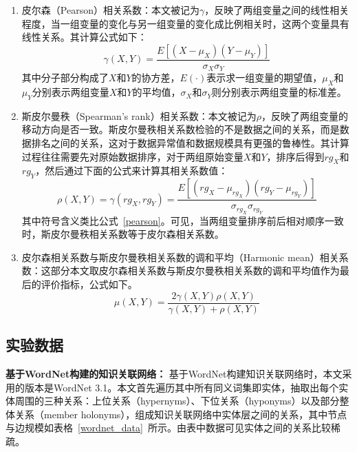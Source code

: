 \begin{enumerate}
    \item 皮尔森（Pearson）相关系数：本文被记为$\gamma$，反映了两组变量之间的线性相关程度，当一组变量的变化与另一组变量的变化成比例相关时，这两个变量具有线性关系。其计算公式如下：
    \begin{equation}
        \label{pearson}
        \gamma(X, Y) = \frac{E[(X-\mu_X)(Y-\mu_Y)]}{\sigma_X \sigma_Y}
    \end{equation}
    \noindent 其中分子部分构成了$X$和$Y$的协方差，$E(\cdot)$表示求一组变量的期望值，$\mu_X$和$\mu_Y$分别表示两组变量$X$和$Y$的平均值，$\sigma_X$和$\sigma_Y$则分别表示两组变量的标准差。
    \item 斯皮尔曼秩（Spearman's rank）相关系数：本文被记为$\rho$，反映了两组变量的移动方向是否一致。斯皮尔曼秩相关系数检验的不是数据之间的关系，而是数据排名之间的关系，这对于数据异常值和数据规模具有更强的鲁棒性。其计算过程往往需要先对原始数据排序，对于两组原始变量$X$和$Y$，排序后得到$rg_X$和$rg_Y$，然后通过下面的公式来计算其相关系数值：
    \begin{equation}
        \label{spearman}
        \rho(X, Y) = \gamma(rg_X, rg_Y) =  \frac{E[(rg_X-\mu_{rg_X})(rg_Y-\mu_{rg_Y})]}{\sigma_{rg_X} \sigma_{rg_Y}}
    \end{equation}
    \noindent 其中符号含义类比公式~\ref{pearson}。可见，当两组变量排序前后相对顺序一致时，斯皮尔曼秩相关系数等于皮尔森相关系数。
    \item 皮尔森相关系数与斯皮尔曼秩相关系数的调和平均（Harmonic mean）相关系数：这部分本文取皮尔森相关系数与斯皮尔曼秩相关系数的调和平均值作为最后的评价指标，公式如下。
    \begin{equation}
        \label{harmonic}
        \mu(X, Y) = \frac{2\gamma(X, Y)\rho(X, Y)}{\gamma(X, Y)+\rho(X, Y)}
    \end{equation}
\end{enumerate}

\subsection{实验数据}

\textbf{基于WordNet构建的知识关联网络：}
基于WordNet构建知识关联网络时，本文采用的版本是WordNet 3.1。本文首先遍历其中所有同义词集即实体，抽取出每个实体周围的三种关系：上位关系（hypernyms）、下位关系（hyponyms）以及部分整体关系（member holonyms），组成知识关联网络中实体层之间的关系，其中节点与边规模如表格~\ref{wordnet_data}~所示。由表中数据可见实体之间的关系比较稀疏。

